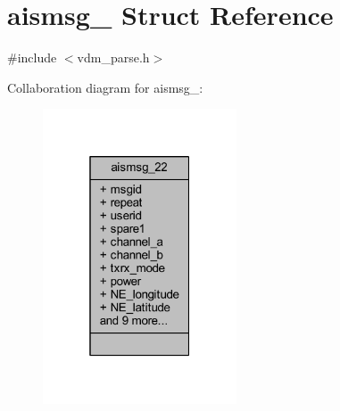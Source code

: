 \hypertarget{structaismsg__22}{}\section{aismsg\+\_ Struct Reference}
\label{structaismsg__22}


{\ttfamily \#include $<$vdm\+\_\+parse.\+h$>$}



Collaboration diagram for aismsg\+\_\+:
\nopagebreak
\begin{figure}[H]
\begin{center}
\leavevmode
\includegraphics[width=163pt]{structaismsg__22__coll__graph}
\end{center}
\end{figure}
